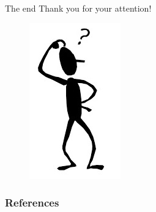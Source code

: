 \documentclass[hyperref={pdfpagelabels=false}]{beamer}
\begin{document}
\begin{frame}{The end}
\centering
\LARGE
\color{red}
Thank you for your attention!
\nocite{Cho_LearningG}
\end{frame}
\begin{frame}
\centering
\begin{figure}
	\includegraphics{who.png}
\end{figure}
\end{frame}
\begin{frame}[allowframebreaks]
	\frametitle{References}
	
	
\end{frame} 
\end{document}
